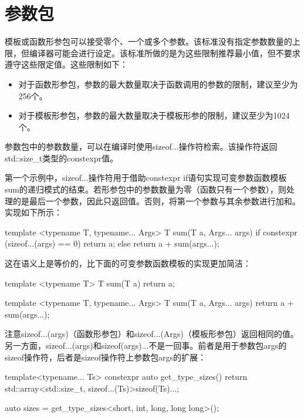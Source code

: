 \section{参数包}

模板或函数形参包可以接受零个、一个或多个参数。该标准没有指定参数数量的上限，但编译器可能会进行设定。该标准所做的是为这些限制推荐最小值，但不要求遵守这些限定值。这些限制如下：

\begin{itemize}
  \item 对于函数形参包，参数的最大数量取决于函数调用的参数的限制，建议至少为256个。
  \item 对于模板形参包，参数的最大数量取决于模板形参的限制，建议至少为1024个。
\end{itemize}

参数包中的参数数量，可以在编译时使用sizeof...操作符检索。该操作符返回std::size_t类型的constexpr值。

第一个示例中，sizeof...操作符用于借助constexpr if语句实现可变参数函数模板sum的递归模式的结束。若形参包中的参数数量为零（函数只有一个参数），则处理的是最后一个参数，因此只返回值。否则，将第一个参数与其余参数进行加和。实现如下所示：

\begin{cppcode}
template <typename T, typename... Args>
T sum(T a, Args... args)
{
	if constexpr (sizeof...(args) == 0)
		return a;
	else
		return a + sum(args...);
}
\end{cppcode}

这在语义上是等价的，比下面的可变参数函数模板的实现更加简洁：

\begin{cppcode}
template <typename T>
T sum(T a)
{
	return a;
}

template <typename T, typename... Args>
T sum(T a, Args... args)
{
	return a + sum(args...);
}
\end{cppcode}

注意sizeof...(args)（函数形参包）和sizeof...(Args)（模板形参包）返回相同的值。另一方面，sizeof...(args)和sizeof(args)...不是一回事。前者是用于参数包args的sizeof操作符，后者是sizeof操作符上参数包args的扩展：

\begin{cppcode}
template<typename... Ts>
constexpr auto get_type_sizes()
{
	return std::array<std::size_t,
	sizeof...(Ts)>{sizeof(Ts)...};
}

auto sizes = get_type_sizes<short, int, long, long long>();
\end{cppcode}

